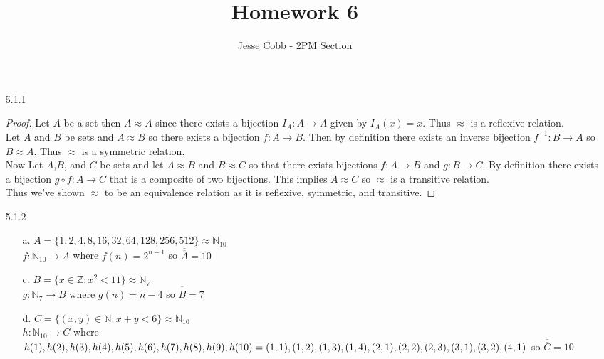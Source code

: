 \documentclass[11pt]{amsart}
\theoremstyle{definition}
\begin{document}
\title{Homework 6}

\author{Jesse Cobb - 2PM Section}

\maketitle

\begin{itemize}

\item[5.1.1] \begin{proof}
	Let $A$ be a set then $A\approx A$ since there exists a bijection $I_A:A\to A$ given by $I_A(x)=x$. Thus $\approx$ is a reflexive relation. \\
	Let $A$ and $B$ be sets and $A\approx B$ so there exists a bijection $f:A\to B$. Then by definition there exists an inverse bijection $f^{-1}:B\to A$ so $B\approx A$. Thus $\approx$ is a symmetric relation. \\
	Now Let $A$,$B$, and $C$ be sets and let $A\approx B$ and $B\approx C$ so that there exists bijections $f:A\to B$ and $g:B\to C$. By definition there exists a bijection $g\circ f:A\to C$ that is a composite of two bijections. This implies $A\approx C$ so $\approx$ is a transitive relation. \\
	Thus we've shown $\approx$ to be an equivalence relation as it is reflexive, symmetric, and transitive.
\end{proof}

\item[5.1.2]
\begin{itemize}
	\item[a.] $A=\{1,2,4,8,16,32,64,128,256,512\}\approx\mathbb{N}_{10}$\\
		$f:\mathbb{N}_{10}\to A$ where $f(n)=2^{n-1}$ so $\overline{\overline A}=10$

	\item[c.] $B=\{x\in\mathbb{Z}:x^2<11\}\approx\mathbb{N}_7$ \\
		$g:\mathbb{N}_7\to B$ where $g(n)=n-4$ so $\overline{\overline B}=7$

	\item[d.] $C=\{(x,y)\in\mathbb{N}:x+y<6\}\approx\mathbb{N}_{10}$\\
		$h:\mathbb{N}_{10}\to C$ where $h(1),h(2),h(3),h(4),h(5),h(6),h(7),h(8),h(9),h(10)\\=(1,1),(1,2),(1,3),(1,4),(2,1),(2,2),(2,3),(3,1),(3,2),(4,1)$ so $\overline{\overline C}=10$
\end{itemize}


\end{itemize}
\end{document}
